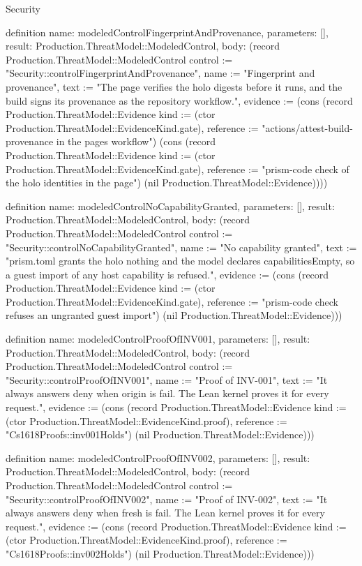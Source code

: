 \begin{lexlean}{Security}
\begin{semanticmodule}
definition{
  name: modeledControlFingerprintAndProvenance,
  parameters: [],
  result: Production.ThreatModel::ModeledControl,
  body: (record Production.ThreatModel::ModeledControl {control := "Security::controlFingerprintAndProvenance", name := "Fingerprint and provenance", text := "The page verifies the holo digests before it runs, and the build signs its provenance as the repository workflow.", evidence := (cons (record Production.ThreatModel::Evidence {kind := (ctor Production.ThreatModel::EvidenceKind.gate), reference := "actions/attest-build-provenance in the pages workflow"}) (cons (record Production.ThreatModel::Evidence {kind := (ctor Production.ThreatModel::EvidenceKind.gate), reference := "prism-code check of the holo identities in the page"}) (nil Production.ThreatModel::Evidence)))})
}

definition{
  name: modeledControlNoCapabilityGranted,
  parameters: [],
  result: Production.ThreatModel::ModeledControl,
  body: (record Production.ThreatModel::ModeledControl {control := "Security::controlNoCapabilityGranted", name := "No capability granted", text := "prism.toml grants the holo nothing and the model declares capabilitiesEmpty, so a guest import of any host capability is refused.", evidence := (cons (record Production.ThreatModel::Evidence {kind := (ctor Production.ThreatModel::EvidenceKind.gate), reference := "prism-code check refuses an ungranted guest import"}) (nil Production.ThreatModel::Evidence))})
}

definition{
  name: modeledControlProofOfINV001,
  parameters: [],
  result: Production.ThreatModel::ModeledControl,
  body: (record Production.ThreatModel::ModeledControl {control := "Security::controlProofOfINV001", name := "Proof of INV-001", text := "It always answers deny when origin is fail. The Lean kernel proves it for every request.", evidence := (cons (record Production.ThreatModel::Evidence {kind := (ctor Production.ThreatModel::EvidenceKind.proof), reference := "Cs1618Proofs::inv001Holds"}) (nil Production.ThreatModel::Evidence))})
}

definition{
  name: modeledControlProofOfINV002,
  parameters: [],
  result: Production.ThreatModel::ModeledControl,
  body: (record Production.ThreatModel::ModeledControl {control := "Security::controlProofOfINV002", name := "Proof of INV-002", text := "It always answers deny when fresh is fail. The Lean kernel proves it for every request.", evidence := (cons (record Production.ThreatModel::Evidence {kind := (ctor Production.ThreatModel::EvidenceKind.proof), reference := "Cs1618Proofs::inv002Holds"}) (nil Production.ThreatModel::Evidence))})
}


\end{semanticmodule}
\end{lexlean}
